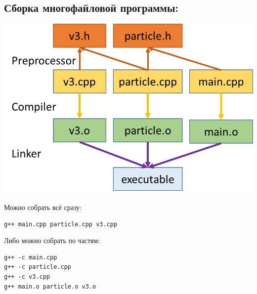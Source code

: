\documentclass{article}
\begin{document}
\subsection*{Сборка многофайловой программы:}
\begin{center}
\includegraphics[scale=0.7]{../images/separate_compilation_linking.png}
\end{center}
Можно собрать всё сразу:
\begin{lstlisting}
g++ main.cpp particle.cpp v3.cpp
\end{lstlisting}
Либо можно собрать по частям:
\begin{lstlisting}
g++ -c main.cpp
g++ -c particle.cpp
g++ -c v3.cpp
g++ main.o particle.o v3.o
\end{lstlisting}
\end{document}
